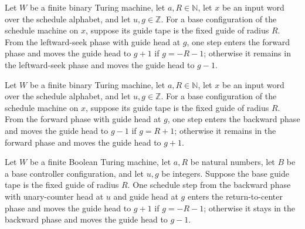 \begin{lemma}
\label{Complexity.macroCfg_seek}
\leanok
{}
Let $W$ be a finite binary Turing machine, let $a,R\in\mathbb{N}$, let $x$ be an input
word over the schedule alphabet, and let $u,g\in\mathbb{Z}$. For a base configuration of
the schedule machine on $x$, suppose its guide tape is the fixed guide of radius $R$.
From the leftward-seek phase with guide head at $g$, one step enters the forward phase
and moves the guide head to $g+1$ if $g=-R-1$; otherwise it remains in the leftward-seek
phase and moves the guide head to $g-1$.
\end{lemma}

\begin{lemma}
\label{Complexity.macroCfg_forward}
\leanok
{}
Let $W$ be a finite binary Turing machine, let $a,R\in\mathbb{N}$, let $x$ be an input
word over the schedule alphabet, and let $u,g\in\mathbb{Z}$. For a base configuration of
the schedule machine on $x$, suppose its guide tape is the fixed guide of radius $R$.
From the forward phase with guide head at $g$, one step enters the backward phase and
moves the guide head to $g-1$ if $g=R+1$; otherwise it remains in the forward phase and
moves the guide head to $g+1$.
\end{lemma}

\begin{lemma}
\label{Complexity.macroCfg_backward}
\leanok
{}
Let $W$ be a finite Boolean Turing machine, let $a,R$ be natural numbers, let $B$ be a
base controller configuration, and let $u,g$ be integers. Suppose the base guide tape is
the fixed guide of radius $R$. One schedule step from the backward phase with
unary-counter head at $u$ and guide head at $g$ enters the return-to-center phase and
moves the guide head to $g+1$ if $g=-R-1$; otherwise it stays in the backward phase and
moves the guide head to $g-1$.
\end{lemma}

